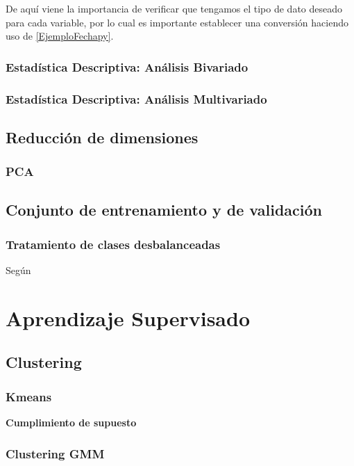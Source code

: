 De aquí viene la importancia de verificar que tengamos el tipo de dato deseado para cada variable, por lo cual es importante establecer una conversión haciendo uso de \ref{EjemploFechapy}.


\subsubsection{Estadística Descriptiva: Análisis Bivariado}

\subsubsection{Estadística Descriptiva: Análisis Multivariado}

\subsection{Reducción de dimensiones}

\subsubsection{PCA}

\subsection{Conjunto de entrenamiento y de validación}

\subsubsection{Tratamiento de clases desbalanceadas}

Según \cite{Rodriguez2018}




\section{Aprendizaje Supervisado}


\subsection{Clustering}


\subsubsection{Kmeans}

\textbf{Cumplimiento de supuesto}


\subsubsection{Clustering GMM}

